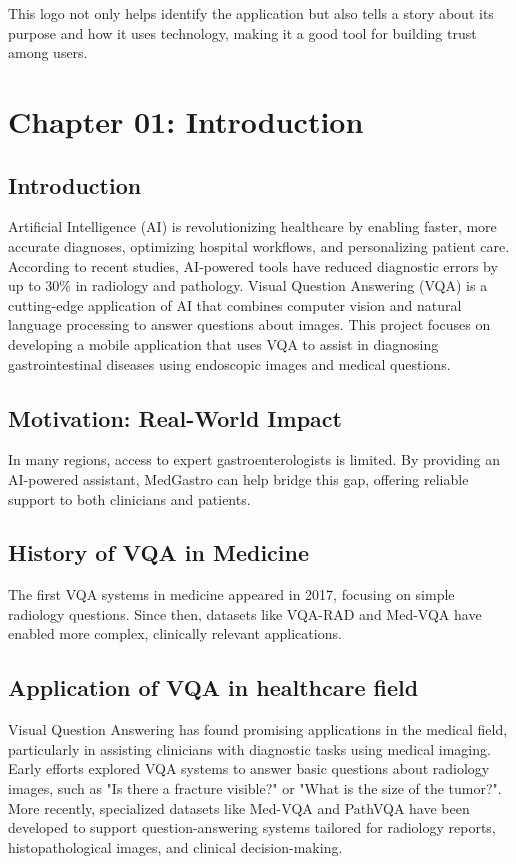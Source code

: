 \documentclass[12pt,a4paper]{report}
\begin{document}
This logo not only helps identify the application but also tells a story about its purpose and how it uses technology, making it a good tool for building trust among users.


\clearpage


\chapter{Chapter 01: Introduction}
\section{Introduction}
Artificial Intelligence (AI) is revolutionizing healthcare by enabling faster, more accurate diagnoses, optimizing hospital workflows, and personalizing patient care. According to recent studies, AI-powered tools have reduced diagnostic errors by up to 30\% in radiology and pathology. Visual Question Answering (VQA) is a cutting-edge application of AI that combines computer vision and natural language processing to answer questions about images. This project focuses on developing a mobile application that uses VQA to assist in diagnosing gastrointestinal diseases using endoscopic images and medical questions.

\section{Motivation: Real-World Impact}
In many regions, access to expert gastroenterologists is limited. By providing an AI-powered assistant, MedGastro can help bridge this gap, offering reliable support to both clinicians and patients.

\section{History of VQA in Medicine}
The first VQA systems in medicine appeared in 2017, focusing on simple radiology questions. Since then, datasets like VQA-RAD and Med-VQA have enabled more complex, clinically relevant applications.

\section{Application of VQA in healthcare field}
Visual Question Answering has found promising applications in the medical field, particularly in assisting clinicians with diagnostic tasks using medical imaging. Early efforts explored VQA systems to answer basic questions about radiology images, such as "Is there a fracture visible?" or "What is the size of the tumor?". More recently, specialized datasets like Med-VQA and PathVQA have been developed to support question-answering systems tailored for radiology reports, histopathological images, and clinical decision-making.
\end{document}

